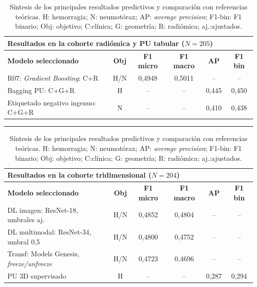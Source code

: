 \begin{table}[p]
\centering
\scriptsize
\setlength{\tabcolsep}{5pt}
\renewcommand{\arraystretch}{1.12}
\caption{Síntesis de los principales resultados predictivos y comparación con referencias teóricas. H: hemorragia; N: neumotórax; AP: \textit{average precision}; F1-bin: F1 binario; Obj: objetivo; C:clínica; G: geometría; R: radiómica; aj.:ajustados.}
\label{tab:resumen_resultados_baselines}


\begin{tabularx}{\textwidth}{Xc c c c c}
\toprule
\multicolumn{6}{l}{\textbf{Resultados en la cohorte radiómica y PU tabular (\(N=205\))}} \\
\midrule
\textbf{Modelo seleccionado} &
\textbf{Obj} &
\textbf{F1 micro} &
\textbf{F1 macro} &
\textbf{AP} &
\textbf{F1 bin} \\
\midrule

R07: \textit{Gradient Boosting}: C+R
& H/N
& 0,4948
& 0,5011
& --
& -- \\

Bagging PU: C+G+R
& H
& --
& --
& 0,445
& 0,450 \\

Etiquetado negativo ingenuo: C+G+R
& N
& --
& --
& 0,410
& 0,438 \\

\end{tabularx}

\noindent\rule{\textwidth}{1.2pt}

\begin{tabularx}{\textwidth}{Xc c c c c}
\toprule
\multicolumn{6}{l}{\textbf{Resultados en la cohorte tridimensional (\(N=204\))}} \\
\midrule
\textbf{Modelo seleccionado} &
\textbf{Obj} &
\textbf{F1 micro} &
\textbf{F1 macro} &
\textbf{AP} &
\textbf{F1 bin} \\
\midrule

DL imagen: ResNet-18, umbrales aj.
& H/N
& 0,4852
& 0,4804
& --
& -- \\

DL multimodal: ResNet-34, umbral 0,5
& H/N
& 0,4800
& 0,4752
& --
& -- \\

Transf: Models Genesis, \textit{freeze/unfreeze}
& H/N
& 0,4723
& 0,4696
& --
& -- \\

PU 3D supervisado
& H
& --
& --
& 0,287
& 0,294 \\


\end{tabularx}
\end{table}
